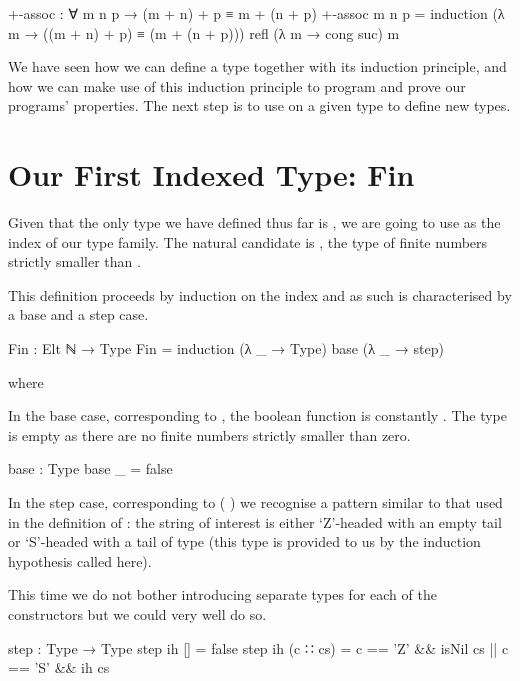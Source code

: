 \documentclass[twocolumn]{article}
\begin{document}
\begin{code}
+-assoc : ∀ m n p → (m + n) + p ≡ m + (n + p)
+-assoc m n p =
  induction
    (λ m → ((m + n) + p) ≡ (m + (n + p)))
    refl
    (λ m → cong suc)
    m
\end{code}

We have seen how we can define a type together with its induction principle,
and how we can make use of this induction principle to program and prove our
programs' properties. The next step is to use  on a given type
to define new types.

\section{Our First Indexed Type: Fin}

Given that the only type we have defined thus far is , we are going to
use as the index of our type family. The natural candidate is { },
the type of finite numbers strictly smaller than .

This definition proceeds by induction on the index and as such is
characterised by a base and a step case.

\begin{code}
Fin : Elt ℕ → Type
Fin = induction (λ _ → Type) base (λ _ → step)

  where
\end{code}

In the base case, corresponding to  , the boolean function is
constantly . The type is empty as there are no finite numbers
strictly smaller than zero.

\begin{code}
  base : Type
  base _ = false
\end{code}

In the step case, corresponding to { ( )}
we recognise a pattern similar to that used in the definition
of : the string of interest is
either `Z'-headed with an empty tail
or `S'-headed with a tail of type   (this type is
provided to us by the induction hypothesis called  here).

This time we do not bother introducing separate types for each of the
constructors but we could very well do so.

\begin{code}
  step : Type → Type
  step ih [] = false
  step ih (c ∷ cs) =  c == 'Z' && isNil cs
                  ||  c == 'S' && ih cs
\end{code}
\end{document}

